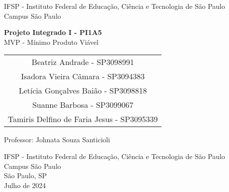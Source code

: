 \documentclass[
    12pt,               %
    openright,          %
    oneside,
    a4paper,            %
    hyphens,
    paginasA3,  %
    GLOSSARIO, %
    TODO, %
    english,            %
    brazil           %
    ]{regras-pi1a5} %
\begin{document}
\frenchspacing 

\newpage

\pretextual


\newcommand{\todonum}[2][]
{\stepcounter{todocounter}\todo[#1]{\thetodocounter: #2}}






\begin{titlepage}
    \begin{center}
        \vspace*{1cm}
        
        {\Large{IFSP - Instituto Federal de Educação, Ciência e Tecnologia de São Paulo}} \\
        \vspace{0.2cm}
        {\large{Campus São Paulo}}
        
        \vspace{6cm}
    
        
        \textbf{\LARGE{Projeto Integrado I - PI1A5}}\\
        \vspace{0.2cm}
        {\large{MVP - Mínimo Produto Viável}}
        
        \vspace{1.5cm}
        
        \begin{tabular}{c}
            {\large Beatriz Andrade - SP3098991} \\
            {\large Isadora Vieira Câmara - SP3094383} \\
            {\large Letícia Gonçalves Baião - SP3098818} \\
            {\large Suanne Barbosa - SP3099067} \\
            {\large Tamiris Delfino de Faria Jesus - SP3095339} \\
        \end{tabular}
        
        \vspace{1.5cm}
        
        {\large Professor: Johnata Souza Santicioli} \\


        \vfill
        
        \large{IFSP - Instituto Federal de Educação, Ciência e Tecnologia de São Paulo \\
        Campus São Paulo \\
        São Paulo, SP \\
        Julho de 2024}
        
    \end{center}
\end{titlepage}
\end{document}
